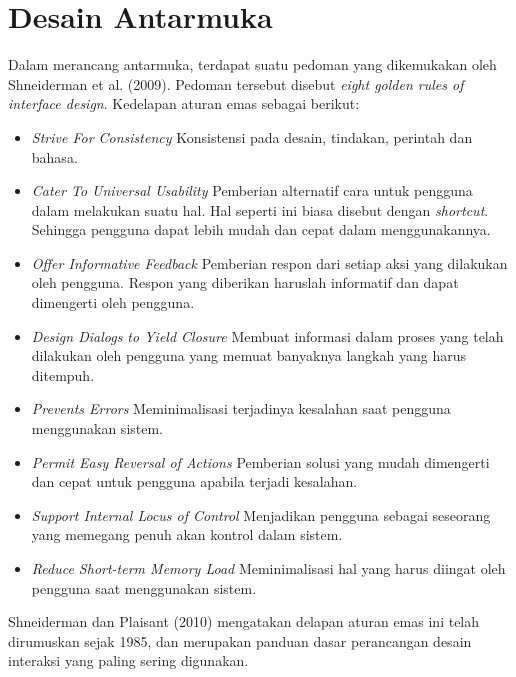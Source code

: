 	
\section{Desain Antarmuka}
Dalam merancang antarmuka, terdapat suatu pedoman yang dikemukakan oleh Shneiderman et al. (2009).
Pedoman tersebut disebut \textit{eight golden rules of interface design}. Kedelapan aturan emas sebagai berikut:

\begin{itemize}
	\item \textit{Strive For Consistency}
	\subitem Konsistensi pada desain, tindakan, perintah dan bahasa.
	\item \textit{Cater To Universal Usability}
	\subitem Pemberian alternatif cara untuk pengguna dalam melakukan suatu hal. Hal seperti ini biasa disebut dengan \textit{shortcut}. Sehingga pengguna dapat lebih mudah dan cepat dalam menggunakannya.
	\item \textit{Offer Informative Feedback}
	\subitem Pemberian respon dari setiap aksi yang dilakukan oleh pengguna. Respon yang diberikan haruslah informatif dan dapat dimengerti oleh pengguna.
	\item \textit{Design Dialogs to Yield Closure}
	\subitem Membuat informasi dalam proses yang telah dilakukan oleh pengguna yang memuat banyaknya langkah yang harus ditempuh.
	\item \textit{Prevents Errors}
	\subitem Meminimalisasi terjadinya kesalahan saat pengguna menggunakan sistem.
	\item \textit{Permit Easy Reversal of Actions}
	\subitem Pemberian solusi yang mudah dimengerti dan cepat untuk pengguna apabila terjadi kesalahan.
	\item \textit{Support Internal Locus of Control}
	\subitem Menjadikan pengguna sebagai seseorang yang memegang penuh akan kontrol dalam sistem.
	\item \textit{Reduce Short-term Memory Load}
	\subitem Meminimalisasi hal yang harus diingat oleh pengguna saat menggunakan sistem.
\end{itemize}

Shneiderman dan Plaisant (2010) mengatakan delapan aturan emas ini telah dirumuskan sejak 1985, dan merupakan panduan dasar perancangan desain interaksi yang paling sering digunakan.
	
